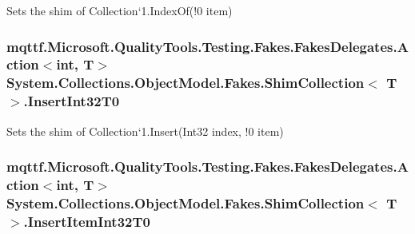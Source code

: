Sets the shim of Collection`1.Index\-Of(!0 item)

\hypertarget{class_system_1_1_collections_1_1_object_model_1_1_fakes_1_1_shim_collection_3_01_t_01_4_af3c64335f1659bb8da5daa333fae7917}{
\subsubsection[{Insert\-Int32\-T0}]{\setlength{\rightskip}{0pt plus 5cm}mqttf.\-Microsoft.\-Quality\-Tools.\-Testing.\-Fakes.\-Fakes\-Delegates.\-Action$<$int, T$>$ System.\-Collections.\-Object\-Model.\-Fakes.\-Shim\-Collection$<$ T $>$.Insert\-Int32\-T0\hspace{0.3cm}{\ttfamily [set]}}}\label{class_system_1_1_collections_1_1_object_model_1_1_fakes_1_1_shim_collection_3_01_t_01_4_af3c64335f1659bb8da5daa333fae7917}


Sets the shim of Collection`1.Insert(Int32 index, !0 item)

\hypertarget{class_system_1_1_collections_1_1_object_model_1_1_fakes_1_1_shim_collection_3_01_t_01_4_a5f46e17014bb493a83d2208771c2aa4e}{
\subsubsection[{Insert\-Item\-Int32\-T0}]{\setlength{\rightskip}{0pt plus 5cm}mqttf.\-Microsoft.\-Quality\-Tools.\-Testing.\-Fakes.\-Fakes\-Delegates.\-Action$<$int, T$>$ System.\-Collections.\-Object\-Model.\-Fakes.\-Shim\-Collection$<$ T $>$.Insert\-Item\-Int32\-T0\hspace{0.3cm}{\ttfamily [set]}}}\label{class_system_1_1_collections_1_1_object_model_1_1_fakes_1_1_shim_collection_3_01_t_01_4_a5f46e17014bb493a83d2208771c2aa4e}


